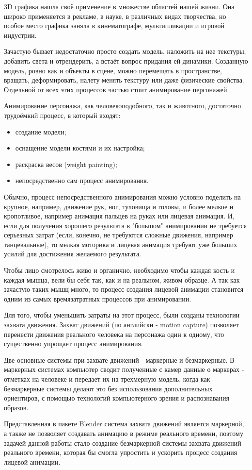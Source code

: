 
3D графика нашла своё применение в множестве областей нашей жизни. Она широко применяется в рекламе, в науке, в различных видах творчества, но особое место графика заняла в кинематографе, мультипликации и игровой индустрии.
 
Зачастую бывает недостаточно просто создать модель, наложить на нее текстуры, добавить света и отрендерить, а встаёт вопрос придания ей динамики. Созданную модель, ровно как и объекты в сцене, можно перемещать в пространстве, вращать, деформировать, налету менять текстуру или даже физические свойства. Отдельной от всех этих процессов частью стоит анимирование персонажей.

Анимирование персонажа, как человекоподобного, так и животного, достаточно трудоёмкий процесс, в который входят:
\begin{itemize}
	\item создание модели;
	\item оснащение модели костями и их настройка;
	\item раскраска весов (weight painting);
	\item непосредственно сам процесс анимирования.
\end{itemize}

Обычно, процесс непосредственного анимирования можно условно поделить на крупное, например, движение рук, ног, туловища и головы, и более мелкое и кропотливое, например анимация пальцев на руках или лицевая анимация. И, если для получения хорошего результата в "большом" анимировании не требуется серьезных затрат (если, конечно, не требуются сложные движения, например танцевальные), то мелкая моторика и лицевая анимация требуют уже больших усилий для достижения желаемого результата.

Чтобы лицо смотрелось живо и органично, необходимо чтобы каждая кость и каждая мышца, вели бы себя так, как и на реальном, живом образце. А так как зачастую таких мышц много, то процесс создания лицевой анимации становится одним из самых времязатратных процессов при анимировании.

Для того, чтобы уменьшить затраты на этот процесс, были созданы технологии захвата движения. Захват движений (по английски - motion capture) позволяет перенести движения реального человека на персонажа один к одному, что существенно упрощает процесс анимирования.

Две основные системы при захвате движений - маркерные и безмаркерные. В маркерных системах компьютер сводит полученные с камер данные о маркерах - отметках на человеке и передает их на трехмерную модель, когда как безмаркерные системы делают это без использования дополнительных ориентиров, с помощью технологий компьютерного зрения и распознавания образов.

Представленная в пакете Blender система захвата движений является маркерной, а также не позволяет создавать анимацию в режиме реального времени, поэтому задачей данной работы стало создание безмаркерной системы захвата движений реального времени, которая бы смогла упростить и ускорить процесс создания лицевой анимации.

\clearpage
